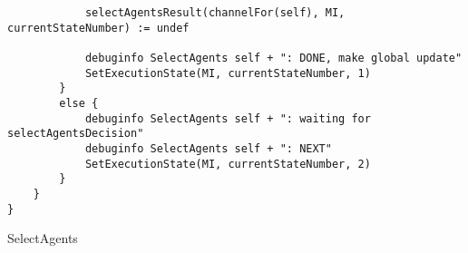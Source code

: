 \begin{listing}[H]
\begin{verbatim}
            selectAgentsResult(channelFor(self), MI, currentStateNumber) := undef

            debuginfo SelectAgents self + ": DONE, make global update"
            SetExecutionState(MI, currentStateNumber, 1)
        }
        else {
            debuginfo SelectAgents self + ": waiting for selectAgentsDecision"
            debuginfo SelectAgents self + ": NEXT"
            SetExecutionState(MI, currentStateNumber, 2)
        }
    }
}
\end{verbatim}
\caption{SelectAgents}
\label{lst:asm:SelectAgents}
\end{listing}
